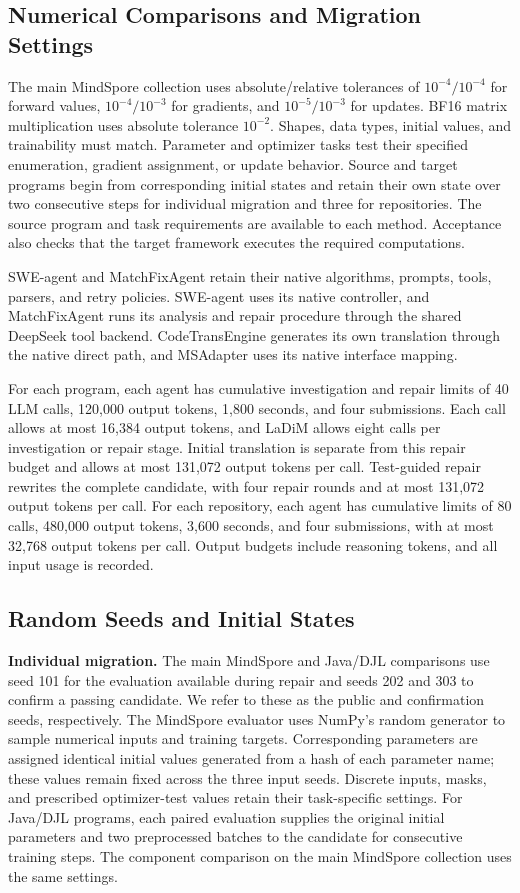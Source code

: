 \documentclass{article}
\begin{document}
\subsection{Numerical Comparisons and Migration Settings}
\label{sec:migration-settings}
The main MindSpore collection uses absolute/relative tolerances of $10^{-4}/10^{-4}$ for forward values, $10^{-4}/10^{-3}$ for gradients, and $10^{-5}/10^{-3}$ for updates. BF16 matrix multiplication uses absolute tolerance $10^{-2}$. Shapes, data types, initial values, and trainability must match. Parameter and optimizer tasks test their specified enumeration, gradient assignment, or update behavior. Source and target programs begin from corresponding initial states and retain their own state over two consecutive steps for individual migration and three for repositories. The source program and task requirements are available to each method. Acceptance also checks that the target framework executes the required computations.

SWE-agent and MatchFixAgent retain their native algorithms, prompts, tools, parsers, and retry policies. SWE-agent uses its native controller, and MatchFixAgent runs its analysis and repair procedure through the shared DeepSeek tool backend. CodeTransEngine generates its own translation through the native direct path, and MSAdapter uses its native interface mapping.

For each program, each agent has cumulative investigation and repair limits of 40 LLM calls, 120,000 output tokens, 1,800 seconds, and four submissions. Each call allows at most 16,384 output tokens, and LaDiM allows eight calls per investigation or repair stage. Initial translation is separate from this repair budget and allows at most 131,072 output tokens per call. Test-guided repair rewrites the complete candidate, with four repair rounds and at most 131,072 output tokens per call. For each repository, each agent has cumulative limits of 80 calls, 480,000 output tokens, 3,600 seconds, and four submissions, with at most 32,768 output tokens per call. Output budgets include reasoning tokens, and all input usage is recorded.

\subsection{Random Seeds and Initial States}
\label{sec:seeds}

\textbf{Individual migration.} The main MindSpore and Java/DJL comparisons use seed 101 for the evaluation available during repair and seeds 202 and 303 to confirm a passing candidate. We refer to these as the public and confirmation seeds, respectively. The MindSpore evaluator uses NumPy's random generator to sample numerical inputs and training targets. Corresponding parameters are assigned identical initial values generated from a hash of each parameter name; these values remain fixed across the three input seeds. Discrete inputs, masks, and prescribed optimizer-test values retain their task-specific settings. For Java/DJL programs, each paired evaluation supplies the original initial parameters and two preprocessed batches to the candidate for consecutive training steps. The component comparison on the main MindSpore collection uses the same settings.
\end{document}

